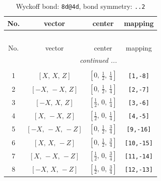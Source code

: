 \documentclass[fleqn,8pt]{jsarticle}
\begin{document}
\begin{longtable}{cccc}
\caption{Wyckoff bond: {\tt 8d@4d}, bond symmetry: {\tt ..2}}
 \\
 \hline \hline
No. & vector & center & mapping \\ \hline \endfirsthead

\multicolumn{3}{l}{\tablename\ \thetable{}} \\
 \hline \hline
No. & vector & center & mapping \\ \hline \endhead

 \hline \hline
\multicolumn{3}{r}{\footnotesize\it continued ...} \\ \endfoot

 \hline \hline
\multicolumn{3}{r}{} \\ \endlastfoot

1 & $\left[ X,\, X,\, Z \right]$ & $\left[ 0,\, \frac{1}{2},\, \frac{1}{4} \right]$ & {\tt [1,-8]} \\ \hline
2 & $\left[ - X,\, - X,\, Z \right]$ & $\left[ 0,\, \frac{1}{2},\, \frac{1}{4} \right]$ & {\tt [2,-7]} \\ \hline
3 & $\left[ - X,\, X,\, Z \right]$ & $\left[ \frac{1}{2},\, 0,\, \frac{1}{4} \right]$ & {\tt [3,-6]} \\ \hline
4 & $\left[ X,\, - X,\, Z \right]$ & $\left[ \frac{1}{2},\, 0,\, \frac{1}{4} \right]$ & {\tt [4,-5]} \\ \hline
5 & $\left[ - X,\, - X,\, - Z \right]$ & $\left[ 0,\, \frac{1}{2},\, \frac{3}{4} \right]$ & {\tt [9,-16]} \\ \hline
6 & $\left[ X,\, X,\, - Z \right]$ & $\left[ 0,\, \frac{1}{2},\, \frac{3}{4} \right]$ & {\tt [10,-15]} \\ \hline
7 & $\left[ X,\, - X,\, - Z \right]$ & $\left[ \frac{1}{2},\, 0,\, \frac{3}{4} \right]$ & {\tt [11,-14]} \\ \hline
8 & $\left[ - X,\, X,\, - Z \right]$ & $\left[ \frac{1}{2},\, 0,\, \frac{3}{4} \right]$ & {\tt [12,-13]} \\
\end{longtable}
\renewcommand{\arraystretch}{1.2}
\end{document}
